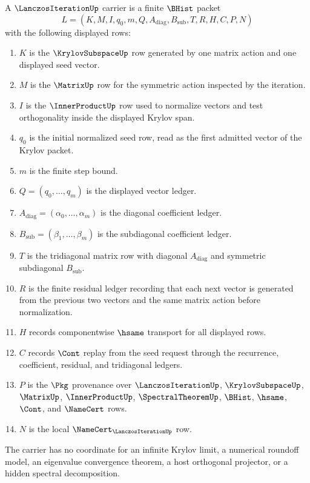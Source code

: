 \begin{definition}
\label{def:lanczos-iteration-carrier}
A $\LanczosIterationUp$ carrier is a finite $\BHist$ packet
$$
L=(K,M,I,q_0,m,Q,A_{\mathrm{diag}},B_{\mathrm{sub}},T,R,H,C,P,N)
$$
with the following displayed rows:
\begin{enumerate}
\item $K$ is the $\KrylovSubspaceUp$ row generated by one matrix action and one displayed seed vector.
\item $M$ is the $\MatrixUp$ row for the symmetric action inspected by the iteration.
\item $I$ is the $\InnerProductUp$ row used to normalize vectors and test orthogonality inside the displayed Krylov span.
\item $q_0$ is the initial normalized seed row, read as the first admitted vector of the Krylov packet.
\item $m$ is the finite step bound.
\item $Q=(q_0,\ldots,q_m)$ is the displayed vector ledger.
\item $A_{\mathrm{diag}}=(\alpha_0,\ldots,\alpha_m)$ is the diagonal coefficient ledger.
\item $B_{\mathrm{sub}}=(\beta_1,\ldots,\beta_m)$ is the subdiagonal coefficient ledger.
\item $T$ is the tridiagonal matrix row with diagonal $A_{\mathrm{diag}}$ and symmetric subdiagonal $B_{\mathrm{sub}}$.
\item $R$ is the finite residual ledger recording that each next vector is generated from the previous two vectors and the same matrix action before normalization.
\item $H$ records componentwise $\hsame$ transport for all displayed rows.
\item $C$ records $\Cont$ replay from the seed request through the recurrence, coefficient, residual, and tridiagonal ledgers.
\item $P$ is the $\Pkg$ provenance over $\LanczosIterationUp$, $\KrylovSubspaceUp$, $\MatrixUp$, $\InnerProductUp$, $\SpectralTheoremUp$, $\BHist$, $\hsame$, $\Cont$, and $\NameCert$ rows.
\item $N$ is the local $\NameCert_{\LanczosIterationUp}$ row.
\end{enumerate}
The carrier has no coordinate for an infinite Krylov limit, a numerical roundoff model, an eigenvalue convergence theorem, a host orthogonal projector, or a hidden spectral decomposition.
\end{definition}

